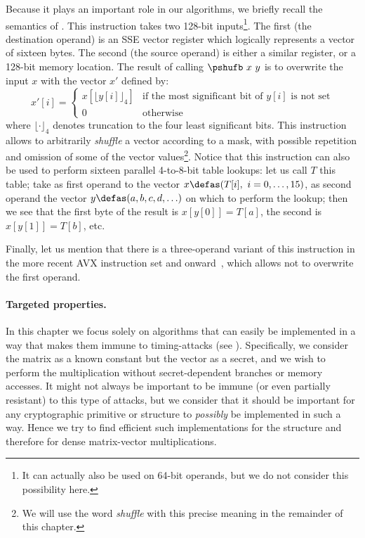 Because it plays an important role in our algorithms, we briefly recall the semantics of \pshufb{}.
This instruction takes two 128-bit inputs\footnote{It can actually also be used on 64-bit operands, but we do not
consider this possibility here.}. The first (the destination operand) is an \xmm{} SSE vector register which logically represents
a vector of sixteen bytes. The second (the source operand) is either a similar \xmm{} register, or a 128-bit memory location. The result of calling
$\pshufb~x~y$ is to overwrite the input $x$ with the vector $x'$ defined by:
\[
x'[i] = \left\{
				\begin{array}{ll}
				x[\lfloor y[i]\rfloor_4]  & \text{if the most significant bit of $y[i]$ is not set}\\
				0 & \text{otherwise}
				\end{array}
	    \right.
\]
where $\lfloor\cdot\rfloor_4$ denotes truncation to the four least significant bits.
This instruction allows to arbitrarily \emph{shuffle} a vector according to a mask, with possible repetition and omission of some of the vector
values\footnote{We will use the word \emph{shuffle} with this precise meaning in the remainder of this chapter.}.
Notice that this instruction can also be used to perform sixteen parallel 4-to-8-bit table lookups: let us call $T$ this table; take
as first operand to \pshufb{} the vector $x \defas (T[i],~i = 0,\ldots,15)$, as second operand the vector
$y \defas (a, b, c, d, \ldots)$
on which to perform the lookup; then we see that the first byte of the result is $x[y[0]] = T[a]$, the second is $x[y[1]] = T[b]$,
etc.

Finally, let us mention that there is a three-operand variant of this instruction in the more recent AVX instruction set and onward~\cite{ia64},
which allows not to overwrite the first operand.


\paragraph{Targeted properties.} In this chapter we focus solely on algorithms that can easily be implemented in a way that makes
them immune to timing-attacks (see \eg \cite{timinattacks}). Specifically, we consider the matrix as a known constant but the vector as a secret, and we wish to perform
the multiplication without secret-dependent branches or memory accesses. It might not always be important to be immune (or even partially resistant) to this type
of attacks, but we consider that it should be important for any cryptographic primitive or structure to \emph{possibly} be implemented in such a way. Hence we try
to find efficient such implementations for the \shark{} structure and therefore for dense matrix-vector multiplications.

